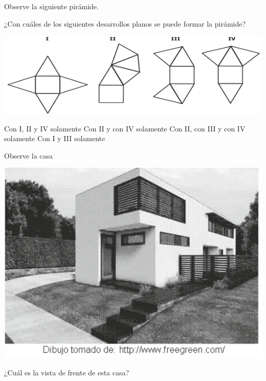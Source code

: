 \documentclass[10pt,letterpaper,addpoints]{exam}
\begin{document}
\begin{multicols}{2}
 \begin{questions}
 \question Observe la siguiente pirámide.
 \begin{center}
 \end{center}
 ¿Con cuáles de los siguientes desarrollos planos se puede formar la pirámide?
 \begin{center}
 \includegraphics[scale=.45]{Images/Pantallazo.png} 
 \end{center}
 \begin{choices}
 \CorrectChoice Con I, II y IV solamente
 \choice Con II y con IV solamente
 \choice Con II, con III y con IV solamente
  \choice Con I y III solamente
 \end{choices}
 \question Observe la casa 
 \begin{center}
 \includegraphics[scale=.15]{Images/frente-casa.png} 
 \end{center}
 ¿Cuál es la vista de frente de esta casa?

\end{questions}
\end{multicols}
\end{document}
